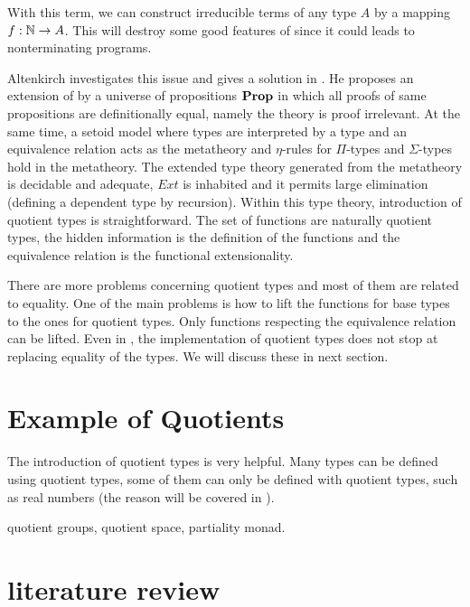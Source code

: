 
With this term, we can construct irreducible terms of any type $A$ by a
mapping $f : \mathbb{N} \rightarrow A$. This will destroy some good features of \itt
since it could leads to nonterminating programs.

Altenkirch investigates this issue and gives a solution in
\cite{alti:lics99}. He proposes an extension of \itt by a universe of
propositions $\operatorname{\mathbf{Prop}}$ in which all proofs of same propositions are
definitionally equal, namely the theory is proof irrelevant. At the same time,
a setoid model where types are interpreted by a type and an equivalence relation acts as the metatheory and $\eta$-rules for
$\Pi$-types and $\Sigma$-types hold in the metatheory. The extended type
theory generated from the metatheory is decidable and adequate, $Ext$ is
inhabited and it permits large elimination (defining a dependent type by recursion). Within this type theory,
introduction of quotient types is straightforward. 
The set of functions are naturally quotient types, the hidden information is the
definition of the functions and the equivalence relation is the
functional extensionality.

There are more problems concerning quotient types and most
of them are related to equality. One of the main problems is how to lift the functions for
base types to the ones for quotient types. Only functions respecting the
equivalence relation can be lifted. Even in \ett, the implementation
of quotient types does not stop at replacing equality of the types. We
will discuss these in next section.



\section{Example of Quotients}

The introduction of quotient types is very helpful. Many types can be
defined using quotient types, some of them can only be defined with quotient types, such as real
numbers (the reason will be covered in ).




quotient groups, quotient space, partiality monad.


\section{literature review}


